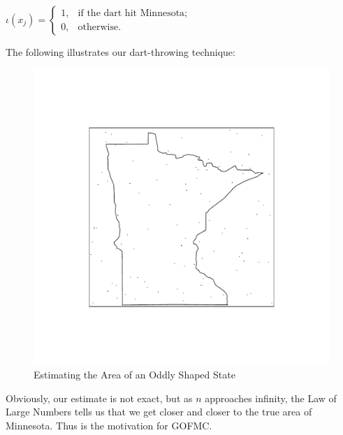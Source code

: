\documentclass[12pt,twoside]{reedthesis}
\begin{document}
			\begin{center}
		 	$\iota(x_j) = 
			\begin{cases} 1, & \text{if the dart hit Minnesota}; \\
			0, & \text{otherwise}. \end{cases}$
			 \end {center}
			The following illustrates our dart-throwing technique:
			
			\begin{figure}[h]
		       	\centering
		    	\includegraphics[clip=true, viewport=.3in 1in 6in 6in,scale=0.5]{mn_box_pts}
		     	\caption{Estimating the Area of an Oddly Shaped State}
	 		\label{subd}
			\end{figure}	

			Obviously, our estimate is not exact, but as $n$ approaches infinity, the Law of Large Numbers tells us that we get closer and closer to the true area of Minnesota. Thus is the motivation for GOFMC.
\end{document}
